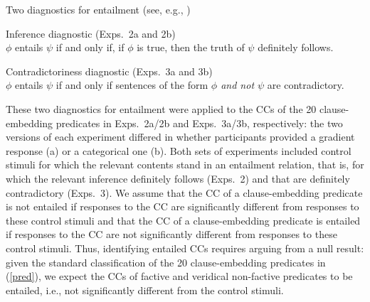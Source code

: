\documentclass[11pt,fleqn]{article}
\newcommand{\6}{\mbox{$[\hspace*{-.6mm}[$}}
\newcommand{\9}{\mbox{$]\hspace*{-.6mm}]$}}
\begin{document}
\begin{exe}
\ex\label{diag} Two diagnostics for entailment \hfill (see, e.g., \citealt[\S3.1]{ccmg90})
\begin{xlist}
\ex  Inference diagnostic (Exps.~2a and 2b)\\ $\phi$ entails $\psi$ if and only if, if $\phi$ is true, then the truth of $\psi$ definitely follows. 

\ex  Contradictoriness diagnostic  (Exps.~3a and 3b)\\ $\phi$ entails $\psi$ if and only if sentences of the form {\em $\phi$ and not $\psi$} are contradictory. 

\end{xlist}
\end{exe}
These two diagnostics for entailment were applied to the CCs of the 20 clause-embedding predicates in Exps.~2a/2b and Exps.~3a/3b, respectively: the two versions of each experiment differed in whether participants provided a gradient response (a) or a categorical one (b).  Both sets of experiments included control stimuli for which the relevant contents stand in an entailment relation, that is, for which the relevant inference definitely follows (Exps.~2) and that are definitely contradictory (Exps.~3). We assume that the CC of a clause-embedding predicate is not entailed if responses to the CC are significantly different from responses to these control stimuli and that the CC of a clause-embedding predicate is entailed if responses to the CC are not significantly different from responses to these control stimuli. Thus, identifying entailed CCs  requires arguing from a null result: given the standard classification of the 20 clause-embedding predicates in (\ref{pred}), we expect the CCs of factive and veridical non-factive predicates to be entailed, i.e., not significantly different from the control stimuli.

\end{document}
